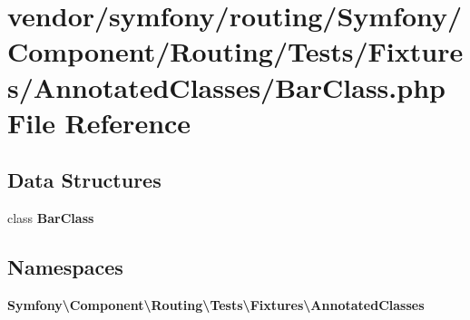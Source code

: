 \section{vendor/symfony/routing/\+Symfony/\+Component/\+Routing/\+Tests/\+Fixtures/\+Annotated\+Classes/\+Bar\+Class.php File Reference}
\label{_bar_class_8php}
\subsection*{Data Structures}
\begin{DoxyCompactItemize}
\item 
class {\bf Bar\+Class}
\end{DoxyCompactItemize}
\subsection*{Namespaces}
\begin{DoxyCompactItemize}
\item 
 {\bf Symfony\textbackslash{}\+Component\textbackslash{}\+Routing\textbackslash{}\+Tests\textbackslash{}\+Fixtures\textbackslash{}\+Annotated\+Classes}
\end{DoxyCompactItemize}
